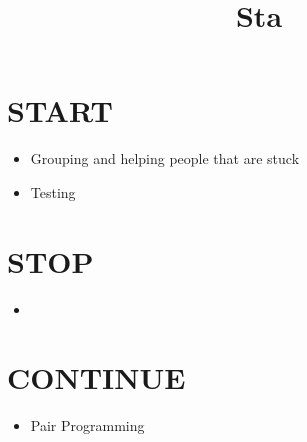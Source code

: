 \documentclass[]{report}
\title{Sta}
\author{}
\begin{document}
\maketitle

\begin{abstract}
\end{abstract}
\section{START}
\begin{itemize}
	\item Grouping and helping people that are stuck
	\item Testing
\end{itemize}
\section{STOP}
\begin{itemize}
	\item 
\end{itemize}
\section{CONTINUE}
\begin{itemize}
	\item Pair Programming
\end{itemize}
\end{document}

